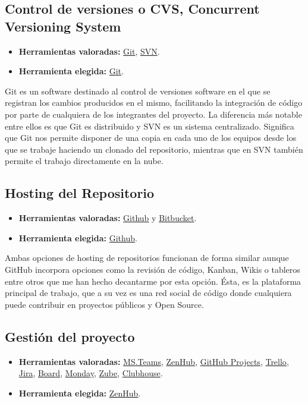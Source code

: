 \subsection{Control de versiones o CVS, Concurrent Versioning System}\label{4:controlVersiones}
\begin{itemize}
    \item \textbf{Herramientas valoradas:} \href{https://git-scm.com/}{Git}, \href{https://subversion.apache.org/}{SVN}.
    \item \textbf{Herramienta elegida:} \href{https://git-scm.com/}{Git}.
\end{itemize}

Git es un software destinado al control de versiones software en el que se registran los cambios producidos en el mismo, facilitando la integración de código por parte de cualquiera de los integrantes del proyecto.
La diferencia más notable entre ellos es que Git es distribuido y SVN es un sistema centralizado. Significa que Git nos permite disponer de una copia en cada uno de los equipos desde los que se trabaje haciendo un clonado del repositorio, mientras que en SVN también permite el trabajo directamente en la nube.

\subsection{Hosting del Repositorio}\label{4:GitHUb}
\begin{itemize}
    \item \textbf{Herramientas valoradas:} \href{https://github.com/}{Github} y \href{https://bitbucket.org/product/}{Bitbucket}.
    \item \textbf{Herramienta elegida:} \href{https://github.com/}{Github}.
\end{itemize}

Ambas opciones de hosting de repositorios funcionan de forma similar aunque GitHub incorpora opciones como la revisión de código, Kanban, Wikis o tableros entre otros que me han hecho decantarme por esta opción.
Ésta, es la plataforma principal de trabajo, que a su vez es una red social de código donde cualquiera puede contribuir en proyectos públicos y Open Source.


\subsection{Gestión del proyecto}\label{4:ZenHub}
\begin{itemize}
    \item \textbf{Herramientas valoradas:} \href{https://teams.microsoft.com/}{MS.Teams}, \href{https://www.zenhub.com/}{ZenHub}, \href{https://github.com/}{GitHub Projects}, \href{https://www.zenhub.com/}{Trello}, \href{https://www.atlassian.com/es/software/jira}{Jira}, \href{https://www.board.com/es#gref}{Board}, \href{https://monday.com/lang/es/}{Monday}, \href{https://zube.io/}{Zube}, \href{https://clubhouse.io/}{Clubhouse}.
    \item \textbf{Herramienta elegida:} \href{https://www.zenhub.com/}{ZenHub}.
\end{itemize}

